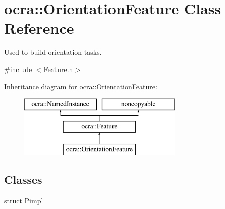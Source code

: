 \hypertarget{classocra_1_1OrientationFeature}{}\section{ocra\+:\+:Orientation\+Feature Class Reference}
\label{classocra_1_1OrientationFeature}


Used to build orientation tasks.  




{\ttfamily \#include $<$Feature.\+h$>$}

Inheritance diagram for ocra\+:\+:Orientation\+Feature\+:\begin{figure}[H]
\begin{center}
\leavevmode
\includegraphics[height=3.000000cm]{d0/d2e/classocra_1_1OrientationFeature}
\end{center}
\end{figure}
\subsection*{Classes}
\begin{DoxyCompactItemize}
\item 
struct \hyperlink{structocra_1_1OrientationFeature_1_1Pimpl}{Pimpl}
\end{DoxyCompactItemize}
